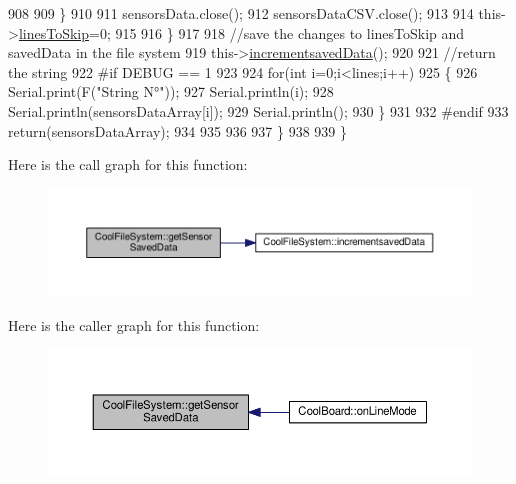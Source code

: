 \begin{DoxyCode}
908 
909             \}
910 
911             sensorsData.close();
912             sensorsDataCSV.close();
913             
914             this->\hyperlink{class_cool_file_system_a84fdb6057e534b395512463daa28ea3c}{linesToSkip}=0;
915         
916         \}
917 
918         \textcolor{comment}{//save the changes to linesToSkip and savedData in the file system}
919         this->\hyperlink{class_cool_file_system_aae045125288f255f3e258073dcada2a6}{incrementsavedData}();
920 
921         \textcolor{comment}{//return the string}
922 \textcolor{preprocessor}{        #if DEBUG == 1}
923         
924             \textcolor{keywordflow}{for}(\textcolor{keywordtype}{int} i=0;i<lines;i++)
925             \{
926                 Serial.print(F(\textcolor{stringliteral}{"String N°"}));
927                 Serial.println(i);
928                 Serial.println(sensorsDataArray[i]);
929                 Serial.println();           
930             \}
931     
932 \textcolor{preprocessor}{        #endif}
933         \textcolor{keywordflow}{return}(sensorsDataArray);
934         
935         
936         
937     \}
938 
939 \}
\end{DoxyCode}
Here is the call graph for this function\+:
\nopagebreak
\begin{figure}[H]
\begin{center}
\leavevmode
\includegraphics[width=350pt]{db/d0c/class_cool_file_system_a3223ffff4266a6300988fab956d6b4b2_cgraph}
\end{center}
\end{figure}
Here is the caller graph for this function\+:
\nopagebreak
\begin{figure}[H]
\begin{center}
\leavevmode
\includegraphics[width=350pt]{db/d0c/class_cool_file_system_a3223ffff4266a6300988fab956d6b4b2_icgraph}
\end{center}
\end{figure}
\mbox{\label{class_cool_file_system_aae045125288f255f3e258073dcada2a6}} 
